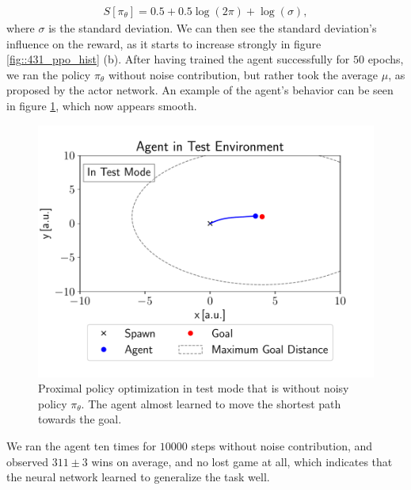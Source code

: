 \begin{align}
S[\pi_\theta] = 0.5 + 0.5\log(2\pi)+\log(\sigma),
\end{align}
where $\sigma$ is the standard deviation. We can then see the standard deviation's influence on the reward, as it starts to increase strongly in figure \ref{fig::431_ppo_hist} (b). After having trained the agent successfully for $50$ epochs, we ran the policy $\pi_\theta$ without noise contribution, but rather took the average $\mu$, as proposed by the actor network. An example of the agent's behavior can be seen in figure \ref{fig::431_ppo_test}, which now appears smooth. 
\begin{figure}[h!]
	\centering
	\includegraphics[scale=.45]{chapters/11_autonomous_walking_experiments/img/test_mode.pdf}
	\caption{Proximal policy optimization in test mode that is without noisy policy $\pi_\theta$. The agent almost learned to move the shortest path towards the goal.}	
	\label{fig::431_ppo_test}
\end{figure}
We ran the agent ten times for $10000$ steps without noise contribution, and observed $311\pm3$ wins on average, and no lost game at all, which indicates that the neural network learned to generalize the task well.
